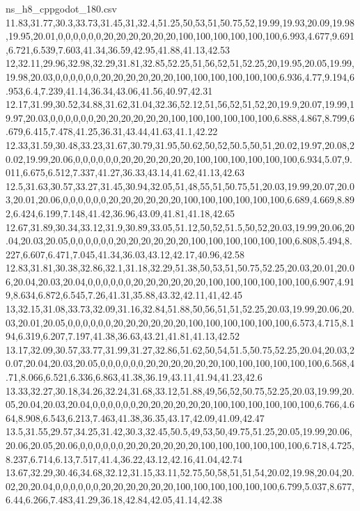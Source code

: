 \begin{filecontents*}[overwrite]{ns_h8_cppgodot_180.csv}
11.83,31.77,30.3,33.73,31.45,31,32.4,51.25,50,53,51,50.75,52,19.99,19.93,20.09,19.98,19.95,20.01,0,0,0,0,0,0,20,20,20,20,20,20,100,100,100,100,100,100,6.993,4.677,9.691,6.721,6.539,7.603,41.34,36.59,42.95,41.88,41.13,42.53
12,32.11,29.96,32.98,32.29,31.81,32.85,52.25,51,56,52,51,52.25,20,19.95,20.05,19.99,19.98,20.03,0,0,0,0,0,0,20,20,20,20,20,20,100,100,100,100,100,100,6.936,4.77,9.194,6.953,6.4,7.239,41.14,36.34,43.06,41.56,40.97,42.31
12.17,31.99,30.52,34.88,31.62,31.04,32.36,52.12,51,56,52,51,52,20,19.9,20.07,19.99,19.97,20.03,0,0,0,0,0,0,20,20,20,20,20,20,100,100,100,100,100,100,6.888,4.867,8.799,6.679,6.415,7.478,41.25,36.31,43.44,41.63,41.1,42.22
12.33,31.59,30.48,33.23,31.67,30.79,31.95,50.62,50,52,50.5,50,51,20.02,19.97,20.08,20.02,19.99,20.06,0,0,0,0,0,0,20,20,20,20,20,20,100,100,100,100,100,100,6.934,5.07,9.011,6.675,6.512,7.337,41.27,36.33,43.14,41.62,41.13,42.63
12.5,31.63,30.57,33.27,31.45,30.94,32.05,51,48,55,51,50.75,51,20.03,19.99,20.07,20.03,20.01,20.06,0,0,0,0,0,0,20,20,20,20,20,20,100,100,100,100,100,100,6.689,4.669,8.892,6.424,6.199,7.148,41.42,36.96,43.09,41.81,41.18,42.65
12.67,31.89,30.34,33.12,31.9,30.89,33.05,51.12,50,52,51.5,50,52,20.03,19.99,20.06,20.04,20.03,20.05,0,0,0,0,0,0,20,20,20,20,20,20,100,100,100,100,100,100,6.808,5.494,8.227,6.607,6.471,7.045,41.34,36.03,43.12,42.17,40.96,42.58
12.83,31.81,30.38,32.86,32.1,31.18,32.29,51.38,50,53,51,50.75,52.25,20.03,20.01,20.06,20.04,20.03,20.04,0,0,0,0,0,0,20,20,20,20,20,20,100,100,100,100,100,100,6.907,4.919,8.634,6.872,6.545,7.26,41.31,35.88,43.32,42.11,41,42.45
13,32.15,31.08,33.73,32.09,31.16,32.84,51.88,50,56,51,51,52.25,20.03,19.99,20.06,20.03,20.01,20.05,0,0,0,0,0,0,20,20,20,20,20,20,100,100,100,100,100,100,6.573,4.715,8.194,6.319,6.207,7.197,41.38,36.63,43.21,41.81,41.13,42.52
13.17,32.09,30.57,33.77,31.99,31.27,32.86,51.62,50,54,51.5,50.75,52.25,20.04,20.03,20.07,20.04,20.03,20.05,0,0,0,0,0,0,20,20,20,20,20,20,100,100,100,100,100,100,6.568,4.71,8.066,6.521,6.336,6.863,41.38,36.19,43.11,41.94,41.23,42.6
13.33,32.27,30.18,34.26,32.24,31.68,33.12,51.88,49,56,52,50.75,52.25,20.03,19.99,20.05,20.04,20.03,20.04,0,0,0,0,0,0,20,20,20,20,20,20,100,100,100,100,100,100,6.766,4.664,8.908,6.543,6.213,7.463,41.38,36.35,43.17,42.09,41.09,42.47
13.5,31.55,29.57,34.25,31.42,30.3,32.45,50.5,49,53,50,49.75,51.25,20.05,19.99,20.06,20.06,20.05,20.06,0,0,0,0,0,0,20,20,20,20,20,20,100,100,100,100,100,100,6.718,4.725,8.237,6.714,6.13,7.517,41.4,36.22,43.12,42.16,41.04,42.74
13.67,32.29,30.46,34.68,32.12,31.15,33.11,52.75,50,58,51,51,54,20.02,19.98,20.04,20.02,20,20.04,0,0,0,0,0,0,20,20,20,20,20,20,100,100,100,100,100,100,6.799,5.037,8.677,6.44,6.266,7.483,41.29,36.18,42.84,42.05,41.14,42.38

\end{filecontents*}
